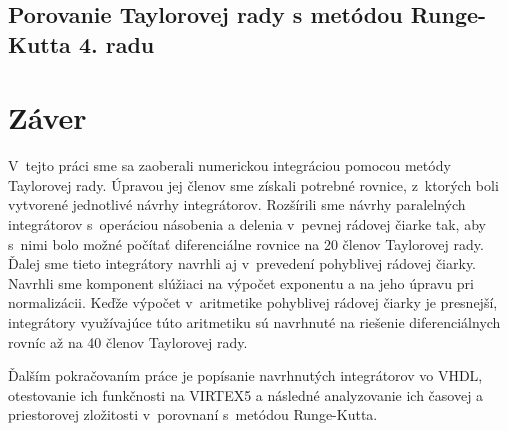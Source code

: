 \section{Porovanie Taylorovej rady s metódou Runge-Kutta 4. radu}

\chapter{Záver}
V~tejto práci sme sa zaoberali numerickou integráciou pomocou metódy Taylorovej rady. Úpravou jej členov sme získali potrebné rovnice, z~ktorých boli vytvorené jednotlivé návrhy integrátorov.
Rozšírili sme návrhy paralelných integrátorov s~operáciou násobenia a delenia v~pevnej rádovej čiarke tak, aby s~nimi bolo možné počítať diferenciálne rovnice na 20 členov Taylorovej rady. Ďalej sme tieto integrátory navrhli aj v~prevedení pohyblivej rádovej čiarky. Navrhli sme komponent slúžiaci na výpočet exponentu a na jeho úpravu pri normalizácii. Keďže výpočet v~aritmetike pohyblivej rádovej čiarky je presnejší, integrátory využívajúce túto aritmetiku sú navrhnuté na riešenie diferenciálnych rovníc až na 40 členov Taylorovej rady.

Ďalším pokračovaním práce je popísanie navrhnutých integrátorov vo VHDL, otestovanie ich funkčnosti na VIRTEX5 a následné analyzovanie ich časovej a priestorovej zložitosti v~porovnaní s~metódou Runge-Kutta.

